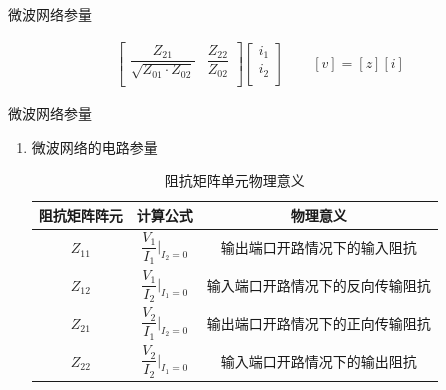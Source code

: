 \begin{frame}{微波网络参量}
\begin{enumerate}
\begin{gather}
\begin{bmatrix*}
                      \dfrac{Z_{21}}{\sqrt{Z_{01}\cdot Z_{02}}} & \dfrac{Z_{22}}{Z_{02}}\\
                  \end{bmatrix*}
                  \begin{bmatrix*}
                      i_1 \\
                      i_2 \\
                  \end{bmatrix*}\label{eqn5-6}
                  \qquad
                  [v]=[z][i]
              \end{gather}
    \end{enumerate}
\end{frame}

\begin{frame}{微波网络参量}
    \begin{enumerate}
        \item 微波网络的电路参量
              \begin{table}
                  \caption{阻抗矩阵单元物理意义}
                  \footnotesize
                  \begin{tabular}{|c|c|c|}
                      \hline
                      \textbf{阻抗矩阵阵元}   & \textbf{计算公式}                            & \textbf{物理意义}             \\ \hline
                      $Z_{11}$ & $\dfrac{V_1}{I_1}\bigg\vert_{I_2=0}$ & 输出端口开路情况下的输入阻抗   \\ \hline
                      $Z_{12}$ & $\dfrac{V_1}{I_2}\bigg\vert_{I_1=0}$ & 输入端口开路情况下的反向传输阻抗 \\ \hline
                      $Z_{21}$ & $\dfrac{V_2}{I_1}\bigg\vert_{I_2=0}$ & 输出端口开路情况下的正向传输阻抗 \\ \hline
                      $Z_{22}$ & $\dfrac{V_2}{I_2}\bigg\vert_{I_1=0}$ & 输入端口开路情况下的输出阻抗   \\ \hline
                  \end{tabular}
              \end{table}
    \end{enumerate}
\end{frame}

